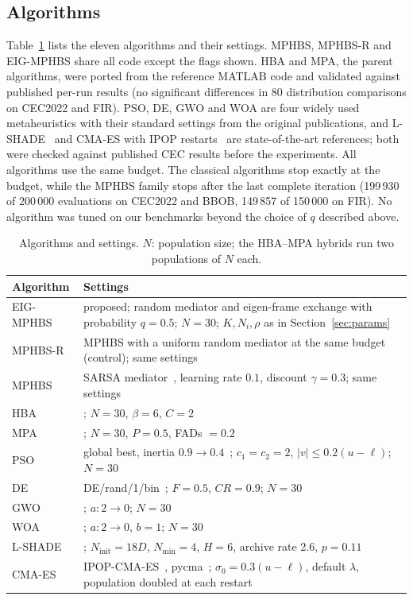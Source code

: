 \documentclass[preprint,12pt,authoryear]{elsarticle}
\theoremstyle{remark}
\begin{document}
\subsection{Algorithms}
Table~\ref{tab:algos} lists the eleven algorithms and their settings. MPHBS, MPHBS-R and EIG-MPHBS share all code
except the flags shown. HBA and MPA, the parent algorithms, were ported from the reference MATLAB code and validated
against published per-run results (no significant differences in 80 distribution comparisons on CEC2022 and FIR). PSO,
DE, GWO and WOA are four widely used metaheuristics with their standard settings from the original publications, and
L-SHADE~\citep{tanabe2014lshade} and CMA-ES with IPOP restarts~\citep{hansen2001cma,auger2005ipop,hansen2019pycma} are
state-of-the-art references; both were checked against published CEC results before the experiments. All algorithms
use the same budget. The classical algorithms stop exactly at the budget, while the MPHBS family stops after the last
complete iteration (199\,930 of 200\,000 evaluations on CEC2022 and BBOB, 149\,857 of 150\,000 on FIR). No algorithm was
tuned on our benchmarks beyond the choice of $q$ described above.

\begin{table}[!htbp]
\centering
\caption{Algorithms and settings. $N$: population size; the HBA--MPA hybrids run two populations of $N$ each.}
\label{tab:algos}
\small
\begin{tabular}{p{2.4cm}p{12.6cm}}
\toprule
Algorithm & Settings \\
\midrule
EIG-MPHBS & proposed; random mediator and eigen-frame exchange with probability $q=0.5$; $N=30$; $K,N_i,\rho$ as in
Section~\ref{sec:params} \\
MPHBS-R & MPHBS with a uniform random mediator at the same budget (control); same settings \\
MPHBS & SARSA mediator~\citep{flores2026mphbs}, learning rate $0.1$, discount $\gamma=0.3$; same settings \\
HBA & \citet{hashim2022hba}; $N=30$, $\beta=6$, $C=2$ \\
MPA & \citet{faramarzi2020mpa}; $N=30$, $P=0.5$, FADs $=0.2$ \\
PSO & global best, inertia $0.9\to0.4$~\citep{kennedy1995pso,shi1998inertia}; $c_1=c_2=2$, $|v|\le0.2(u-\ell)$; $N=30$ \\
DE & DE/rand/1/bin~\citep{storn1997de}; $F=0.5$, $CR=0.9$; $N=30$ \\
GWO & \citet{mirjalili2014gwo}; $a: 2\to0$; $N=30$ \\
WOA & \citet{mirjalili2016woa}; $a: 2\to0$, $b=1$; $N=30$ \\
L-SHADE & \citet{tanabe2014lshade}; $N_\mathrm{init}=18D$, $N_\mathrm{min}=4$, $H=6$, archive rate 2.6, $p=0.11$ \\
CMA-ES & IPOP-CMA-ES~\citep{auger2005ipop}, pycma~\citep{hansen2019pycma}; $\sigma_0=0.3(u-\ell)$, default $\lambda$,
population doubled at each restart \\
\bottomrule
\end{tabular}
\end{table}
\end{document}
